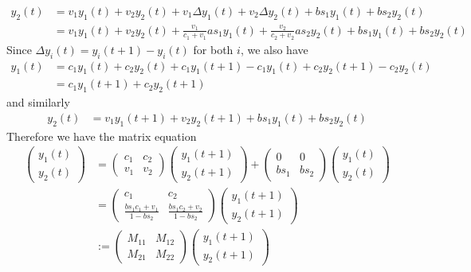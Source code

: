 \begin{align}
	y_2(t) &= v_1y_1(t) + v_2y_2(t) + v_1\Delta y_1(t) + v_2 \Delta y_2(t) + bs_1y_1(t) + bs_2y_2(t) \\
			&= v_1y_1(t) + v_2y_2(t) + \frac{v_1}{c_1+v_1}as_1y_1(t) + \frac{v_2}{c_2+v_2}as_2y_2(t) + bs_1y_1(t) + bs_2y_2(t)
\end{align}
Since $\Delta y_i(t) = y_i(t+1)-y_i(t)$ for both $i$, we also have
\begin{align}
	y_1(t) &= c_1y_1(t) + c_2y_2(t) + c_1y_1(t+1) - c_1y_1(t) + c_2y_2(t+1)-c_2y_2(t) \\
		&= c_1y_1(t+1) + c_2y_2(t+1)
\end{align}
and similarly
\begin{align}
	y_2(t) &= v_1y_1(t+1) + v_2y_2(t+1) + bs_1y_1(t) + bs_2y_2(t)
\end{align}
Therefore we have the matrix equation
\begin{align}
	\begin{pmatrix} y_1(t) \\ y_2(t) \end{pmatrix} &= \begin{pmatrix} c_1 & c_2 \\ v_1 & v_2 \end{pmatrix} \begin{pmatrix} y_1(t+1) \\ y_2(t+1) \end{pmatrix} + \begin{pmatrix} 0 & 0 \\ bs_1 & bs_2 \end{pmatrix} \begin{pmatrix} y_1(t) \\ y_2(t) \end{pmatrix} \\
	&= \begin{pmatrix} c_1 & c_2 \\ \frac{bs_1c_1 + v_1}{1-bs_2} & \frac{bs_1c_2 + v_2}{1-bs_2} \end{pmatrix}\begin{pmatrix} y_1(t+1) \\ y_2(t+1) \end{pmatrix} \\
	&:= \begin{pmatrix} M_{11} & M_{12} \\ M_{21} & M_{22} \end{pmatrix}\begin{pmatrix} y_1(t+1) \\ y_2(t+1) \end{pmatrix}
\end{align}
